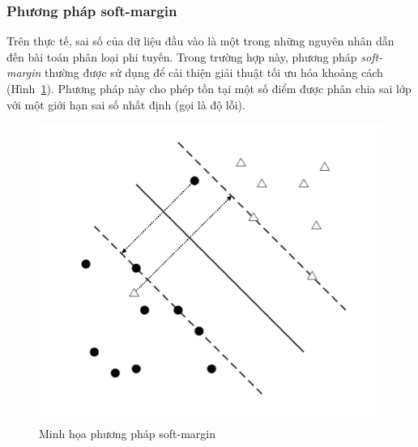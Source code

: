 \subsubsection*{Phương pháp soft-margin}
Trên thực tế, sai số của dữ liệu đầu vào là một trong những nguyên nhân dẫn đến bài toán phân loại phi tuyến. Trong trường hợp này, phương pháp \textit{soft-margin} thường được sử dụng để cải thiện giải thuật tối ưu hóa khoảng cách (Hình~\ref{fig:softmargin}). Phương pháp này cho phép tồn tại một số điểm được phân chia sai lớp với một giới hạn sai số nhất định (gọi là độ lỗi).
\begin{figure}[h]
\centering
\includegraphics[scale=0.45]{hinh/SVM5.png}
\caption{Minh họa phương pháp soft-margin}
\label{fig:softmargin}
\end{figure}
